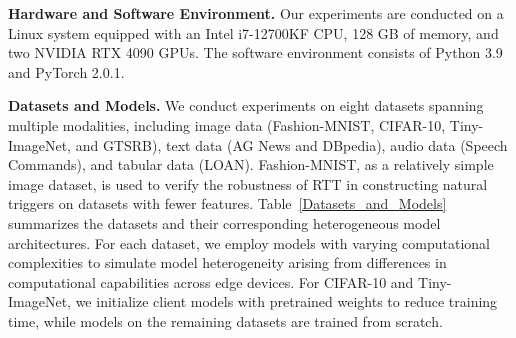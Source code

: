 \documentclass[lettersize,journal]{IEEEtran}
\begin{document}
\textbf{Hardware and Software Environment.}
Our experiments are conducted on a Linux system equipped with an Intel i7-12700KF CPU, 128 GB of memory, and two NVIDIA RTX 4090 GPUs. 
The software environment consists of Python 3.9 and PyTorch 2.0.1.



\textbf{Datasets and Models.} We conduct experiments on eight datasets spanning multiple modalities, including image data (Fashion-MNIST, CIFAR-10, Tiny-ImageNet, and GTSRB), text data (AG News and DBpedia), audio data (Speech Commands), and tabular data (LOAN).
Fashion-MNIST, as a relatively simple image dataset, is used to verify the robustness of RTT in constructing natural triggers on datasets with fewer features.
Table~\ref{Datasets_and_Models} summarizes the datasets and their corresponding heterogeneous model architectures.
For each dataset, we employ models with varying computational complexities to simulate model heterogeneity arising from differences in computational capabilities across edge devices.
For CIFAR-10 and Tiny-ImageNet, we initialize client models with pretrained weights to reduce training time, while models on the remaining datasets are trained from scratch.
\end{document}
